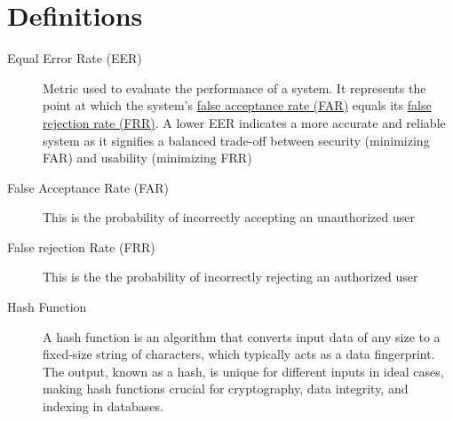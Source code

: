\section{Definitions}
\begin{description}
    \item[Equal Error Rate (EER)] \label{def:EER} Metric used to evaluate the performance of a system. It represents the point at which the system's \hyperref[def:FAR]{false acceptance rate (FAR)} equals its \hyperref[def:FRR]{false rejection rate (FRR)}. A lower EER indicates a more accurate and reliable system as it signifies a balanced trade-off between security (minimizing FAR) and usability (minimizing FRR)

    \item[False Acceptance Rate (FAR)] \label{def:FAR} This is the probability of incorrectly accepting an unauthorized user

    \item[False rejection Rate (FRR)] \label{def:FRR} This is the the probability of incorrectly rejecting an authorized user

    \item[Hash Function] \label{def:Hash_Function} A hash function is an algorithm that converts input data of any size to a fixed-size string of characters, which typically acts as a data fingerprint. The output, known as a hash, is unique for different inputs in ideal cases, making hash functions crucial for cryptography, data integrity, and indexing in databases.
\end{description}
